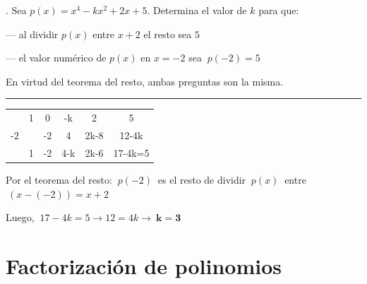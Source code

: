 \vspace{5mm}

\begin{miejercicio}
	. Sea $p(x)=x^4-kx^2+2x+5$. Determina el valor de $k$ para que:
	
	\vspace{2mm}
\hspace{1cm}	--- al dividir $p(x)$ entre $x+2$ el resto sea $5$
	
\hspace{1cm}	--- el valor numérico de $p(x)$ en $x=-2$ sea $\ p(-2)=5$
	\vspace{2mm}
	
	En virtud del teorema del resto, ambas preguntas son la misma.
\rule{250pt}{0.1pt}
\begin{multicols}{2}
\begin{table}[H]
\centering
\begin{tabular}{c|ccccc}
 & 1 & 0 & -k & 2 & 5 \\
-2 &  & -2 & 4 & 2k-8 & 12-4k \\ \hline
 & 1 & -2 & 4-k & \multicolumn{1}{c|}{2k-6} & 17-4k=5 \\ \cline{6-6} 
\end{tabular}
\end{table}	

Por el teorema del resto: $\ p(-2)\ $ es el resto de dividir $\ p(x)\ $ entre $\ (x-(-2))=x+2$

\vspace{2mm} Luego, $\ 17-4k=5\to 12=4k \to \ \boldsymbol{k=3}$
\end{multicols}
\end{miejercicio}



\vspace{1cm}
\section{Factorización de polinomios}
\vspace{0.5cm}

